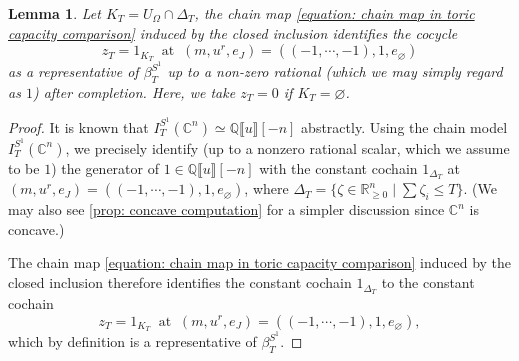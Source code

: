 \documentclass[11pt]{amsart}
\numberwithin{equation}{section}
\theoremstyle{plain}
\newtheorem{Lemma}[lemma]{Lemma}
\theoremstyle{definition}
\theoremstyle{remark}
\newcommand{\bC} { {\mathbb{C}}}
\newcommand{\bQ} { {\mathbb{Q}}}
\newcommand{\bR} { {\mathbb{R}}}
\newcommand{\fpw}[1]{{\llbracket #1\rrbracket}}
\begin{document}
\begin{Lemma}\label{lemma: chain reprensent beta class for toric}Let $K_T=U_\Omega\cap \Delta_T$, the chain map \autoref{equation: chain map in toric capacity comparison} induced by the closed inclusion identifies the cocycle 
\[z_T=1_{K_T} ~\text{ at }~(m,u^r,e_J)=((-1,\cdots,-1),1,e_{\varnothing})\]
as a representative of $\beta_T^{S^1}$ up to a non-zero rational (which we may simply regard as $1$) after completion. Here, we take $z_T=0$ if $K_T=\varnothing$.    
\end{Lemma}
\begin{proof}It is known that $I^{S^1}_{T}(\bC^n)\simeq \bQ\fpw{u}[-n]$ abstractly. Using the chain model $I^{S^1}_{T}(\bC^n)$, we precisely identify (up to a nonzero rational scalar, which we assume to be $1$) the generator of $1\in \bQ\fpw{u}[-n]$ with the constant cochain $1_{\Delta_T}$ at $(m,u^r,e_J)=((-1,\cdots,-1),1,e_{\varnothing})$, where $\Delta_T=\{\zeta\in \bR^n_{\geq0}\mid \sum \zeta_i\leq T\}$. (We may also see \autoref{prop: concave computation} for a simpler discussion since $\bC^n$ is concave.)

The chain map \autoref{equation: chain map in toric capacity comparison} induced by the closed inclusion therefore identifies the constant cochain $1_{\Delta_T}$ to the constant cochain
\[z_T=1_{K_T} ~\text{ at }~(m,u^r,e_J)=((-1,\cdots,-1),1,e_{\varnothing}),\]
which by definition is a representative of $\beta_T^{S^1}$.
\end{proof}
\end{document}
